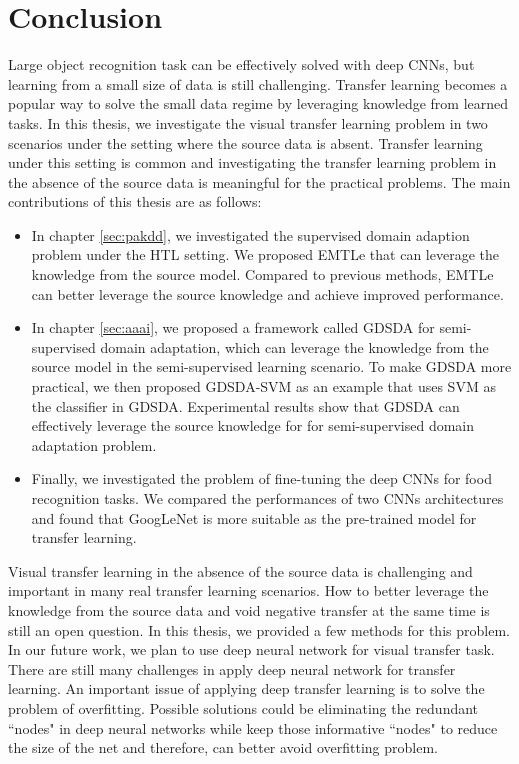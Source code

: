 \chapter{Conclusion}
Large object recognition task can be effectively solved with deep CNNs, but learning from a small size of data is still challenging. Transfer learning becomes a popular way to solve the small data regime by leveraging knowledge from learned tasks. 
In this thesis, we investigate the visual transfer learning problem in two scenarios under the setting where the source data is absent. Transfer learning under this setting is common and investigating the transfer learning problem in the absence of the source data is meaningful for the practical problems. The main contributions of this thesis are as follows:
\begin{itemize}
	\item In chapter \ref{sec:pakdd}, we investigated the supervised domain adaption problem under the HTL setting. We proposed EMTLe that can leverage the knowledge from the source model. Compared to previous methods, EMTLe can better leverage the source knowledge and achieve improved performance.
	\item In chapter \ref{sec:aaai}, we proposed a framework called GDSDA for semi-supervised domain adaptation, which can leverage the knowledge from the source model in the semi-supervised learning scenario. To make GDSDA more practical, we then proposed GDSDA-SVM as an example that uses SVM as the classifier in GDSDA. Experimental results show that GDSDA can effectively leverage the source knowledge for for semi-supervised domain adaptation problem. 
	\item Finally, we investigated the problem of fine-tuning the deep CNNs for food recognition tasks. We compared the performances of two CNNs architectures and found that GoogLeNet is more suitable as the pre-trained model for transfer learning.
\end{itemize}

Visual transfer learning in the absence of the source data is challenging and important in many real transfer learning scenarios. How to better leverage the knowledge from the source data and void negative transfer at the same time is still an open question. In this thesis, we provided a few methods for this problem. In our future work, we plan to use deep neural network for visual transfer task. There are still many challenges in apply deep neural network for transfer learning. An important issue of applying deep transfer learning is to solve the problem of overfitting. Possible solutions could be eliminating the redundant ``nodes" in deep neural networks while keep those informative ``nodes" to reduce the size of the net and therefore, can better avoid overfitting problem.
